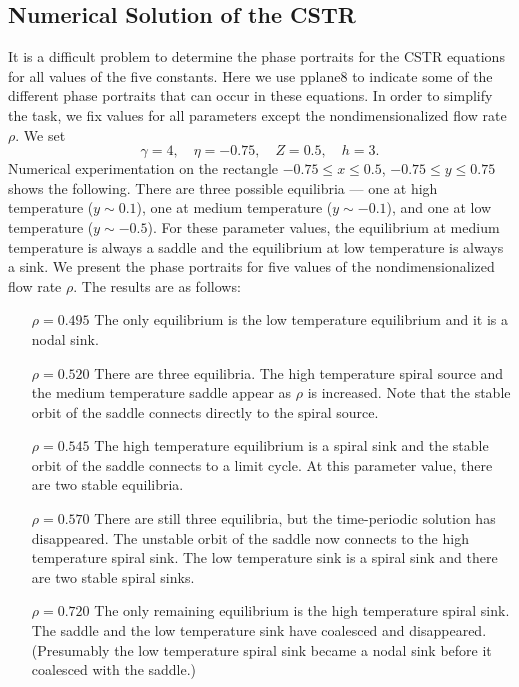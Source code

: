 \documentclass{ximera}
\begin{document}
\subsection*{Numerical Solution of the CSTR}

It is a difficult problem to determine the phase portraits for
the CSTR equations for all values of the five constants. Here we
use {\sf pplane8} to indicate some of the different phase
portraits that can occur in these equations.  In order to
simplify the task, we fix values for all parameters except
the nondimensionalized flow rate $\rho$.  We set
\begin{equation}   \label{e:CSTRparam}
\gamma=4, \quad \eta=-0.75, \quad Z=0.5, \quad h =3.
\end{equation}
Numerical experimentation on the rectangle $-0.75\leq x
\leq 0.5$, $-0.75\leq y\leq 0.75$ shows the following.  There are 
three possible equilibria --- one at high temperature ($y\sim 0.1$), 
one at medium temperature ($y\sim -0.1$), and one at low
temperature ($y\sim -0.5$).  For these parameter values, the 
equilibrium at medium temperature is always a saddle and the 
equilibrium at low temperature is always a 
sink.  We present the 
phase portraits for five values of the nondimensionalized 
flow rate
$\rho$.  The results are as follows:  
\begin{itemize}
\item[$\rho=0.495$] The only equilibrium is the low temperature 
equilibrium and it is a nodal sink. 
\item[$\rho=0.520$] There are three equilibria. The high 
temperature spiral source and the medium temperature saddle appear
as $\rho$ is increased.  Note that the stable orbit of the 
saddle connects directly to the spiral source.
\item[$\rho=0.545$] The high temperature equilibrium is a spiral 
sink and the stable orbit of the saddle connects to a limit 
cycle.  At this parameter value, there are two stable equilibria.
 
\item[$\rho=0.570$] There are still three equilibria, but the 
time-periodic solution has disappeared.  The unstable orbit of 
the saddle now connects to the high temperature spiral sink. The
low temperature sink is a spiral sink and there are two stable
spiral sinks. 
\item[$\rho=0.720$] The only remaining equilibrium is the high
temperature spiral sink.  The saddle and the low temperature 
sink have coalesced and disappeared.  (Presumably the low temperature 
spiral sink became a nodal sink before it coalesced with the saddle.)
\end{itemize}
\end{document}
